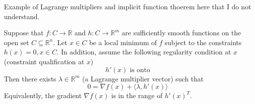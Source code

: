 \begin{example}
    Example of Lagrange multipliers and implicit function thoerem here that I do not understand.
\end{example}
\begin{theorem}
    Suppose that $f: C \to \mathbb R$ and $h: C \to \mathbb R^m$ are sufficiently smooth functions on the open set $C \subseteq \mathbb R^n$. Let $x \in C$ be a local minimum of $f$ subject to the constraints $h(x) = 0, x \in C$. In addition, assume the following regularity condition at $x$ (constraint qualification at $x$) $$h'(x) \text{ is onto}$$
    Then there exists $\lambda \in \mathbb R^m$ (a Lagrange multiplier vector) such that $$0 = \nabla f(x) + \langle \lambda, h'(x) \rangle$$ Equivalently, the gradient $\nabla f(x)$ is in the range of $h'(x)^T$.
\end{theorem}
